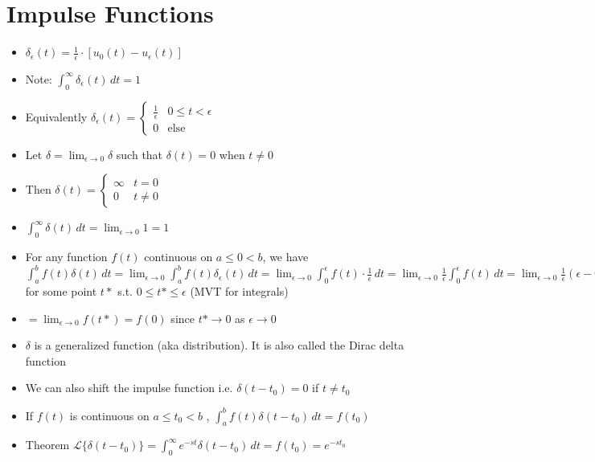 \documentclass[12pt]{article}
\begin{document}
\section{Impulse Functions}

\begin{itemize}
    \item $\delta_{\epsilon} (t) = \frac{1}{\epsilon} \cdot [u_0(t) - u_{\epsilon}(t)]$
    \item Note: $\int_{0}^{\infty} \delta_{\epsilon}(t) \, dt = 1$
    \item Equivalently $\delta_{\epsilon}(t) = \begin{cases}
        \frac{1}{\epsilon} & 0 \leq t < \epsilon \\
        0 & \mathrm{else}
    \end{cases}$
    \item Let $\delta = \lim_{\epsilon \rightarrow 0} \delta$ such that $\delta(t) = 0$ when $t \neq 0$
    \item Then $\delta(t) = \begin{cases}
        \infty & t = 0 \\
        0 & t \neq 0
    \end{cases}$
    \item $\int_{0}^{\infty} \delta(t) \, dt = \lim_{\epsilon \rightarrow 0} 1 = 1$
    \item For any function $f(t)$ continuous on $a \leq 0 < b$, we have $\int_{a}^{b} f(t) \delta(t) \, dt = \lim_{\epsilon \rightarrow 0} \int_{a}^{b} f(t) \delta_{\epsilon} (t) \, dt = \lim_{\epsilon \rightarrow 0} \int_{0}^{\epsilon} f(t) \cdot \frac{1}{\epsilon} \, dt = \lim_{\epsilon \rightarrow 0} \frac{1}{\epsilon} \int_{0}^{\epsilon} f(t) \, dt = \lim_{\epsilon \rightarrow 0} \frac{1}{\epsilon} (\epsilon - 0) f(t*)$ for some point $t*$ s.t. $0 \leq t* \leq \epsilon$ (MVT for integrals)
    \item $ = \lim_{\epsilon \rightarrow 0} f(t*) = f(0)$ since $t* \rightarrow 0$ as $\epsilon \rightarrow 0$
    \item $\delta$ is a generalized function (aka distribution). It is also called the Dirac delta function
    \item We can also shift the impulse function i.e. $\delta (t-t_0) = 0$ if $t \neq t_0$
    \item If $f(t)$ is continuous on $a \leq t_0 < b$ , $\int_{a}^{b} f(t) \delta(t- t_0) \, dt = f(t_0)$
    \item Theorem $\mathcal{L} \{ \delta(t - t_0) \} = \int_{0}^{\infty} e^{-st} \delta(t-t_0) \, dt = f(t_0) = e^{-st_0}$

\end{itemize}
\end{document}

